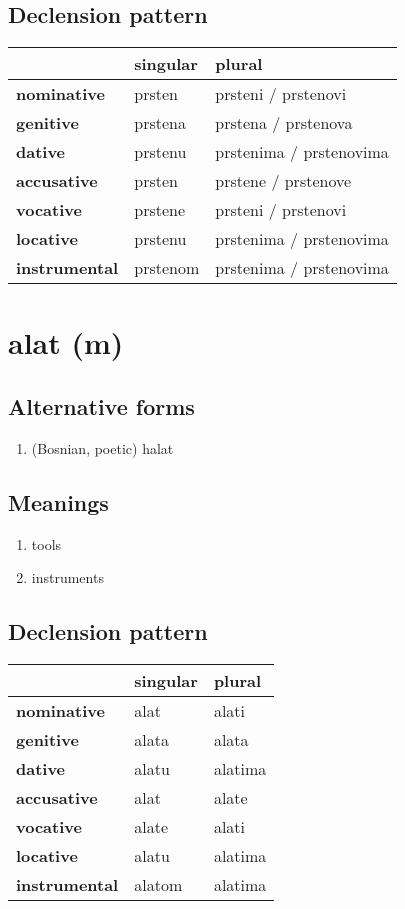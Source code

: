 \subsection*{Declension pattern}
\begin{tabularx}{\linewidth}{Xll}
\toprule
{} &  singular &                   plural \\
\midrule
\textbf{nominative  } &    prsten &      prsteni / prstenovi \\
\textbf{genitive    } &   prstena &      prstena / prstenova \\
\textbf{dative      } &   prstenu &  prstenima / prstenovima \\
\textbf{accusative  } &    prsten &      prstene / prstenove \\
\textbf{vocative    } &   prstene &      prsteni / prstenovi \\
\textbf{locative    } &   prstenu &  prstenima / prstenovima \\
\textbf{instrumental} &  prstenom &  prstenima / prstenovima \\
\bottomrule
\end{tabularx}

\filbreak
\section{alat (m)}
\subsection*{Alternative forms}
\begin{enumerate}
\item (Bosnian, poetic) halat
\end{enumerate}
\subsection*{Meanings}
\begin{enumerate}
\item tools
\item instruments
\end{enumerate}
\subsection*{Declension pattern}
\begin{tabularx}{\linewidth}{Xll}
\toprule
{} & singular &   plural \\
\midrule
\textbf{nominative  } &     alat &    alati \\
\textbf{genitive    } &    alata &    alata \\
\textbf{dative      } &    alatu &  alatima \\
\textbf{accusative  } &     alat &    alate \\
\textbf{vocative    } &    alate &    alati \\
\textbf{locative    } &    alatu &  alatima \\
\textbf{instrumental} &   alatom &  alatima \\
\bottomrule
\end{tabularx}


